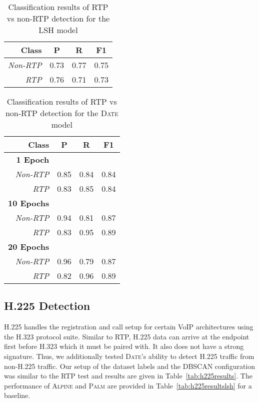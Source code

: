 \begin{table} [h!]
\centering
\begin{tabular}{| r | c | c | c |}
\hline
Class & P & R & F1 \\
\hline
\textit{Non-RTP} & 0.73 & 0.77 & 0.75 \\
\textit{RTP} & 0.76 & 0.71 & 0.73 \\
\hline
\end{tabular}
\caption{Classification results of RTP vs non-RTP detection for the LSH model}
\label{tab:rtpresultslsh}
\end{table}

\begin{table} [h!]
\centering
\begin{tabular}{| r | c | c | c |}
\hline
Class & P & R & F1 \\
\hline
\textbf{1 Epoch} &&& \\
\textit{Non-RTP} & 0.85 & 0.84 & 0.84 \\
\textit{RTP} & 0.83 & 0.85 & 0.84 \\
\hline
\textbf{10 Epochs} &&& \\
\textit{Non-RTP} & 0.94 & 0.81 & 0.87 \\
\textit{RTP} & 0.83 & 0.95 & 0.89 \\
\hline
\textbf{20 Epochs} &&& \\
\textit{Non-RTP} & 0.96 & 0.79 & 0.87 \\
\textit{RTP} & 0.82 & 0.96 & 0.89 \\
\hline
\end{tabular}
\caption{Classification results of RTP vs non-RTP detection for the \textsc{Date} model}
\label{tab:rtpresults}
\end{table}

\subsection{H.225 Detection}
H.225 handles the registration and call setup for certain VoIP architectures using the H.323 protocol suite. Similar to RTP, H.225 data can arrive at the endpoint first before H.323 which it must be paired with. It also does not have a strong signature. Thus, we additionally tested \textsc{Date}'s ability to detect H.225 traffic from non-H.225 traffic. Our setup of the dataset labels and the DBSCAN configuration was similar to the RTP test and results are given in Table~\ref{tab:h225results}. The performance of \textsc{Alpine} and \textsc{Palm} are provided in Table~\ref{tab:h225resultslsh} for a baseline.

